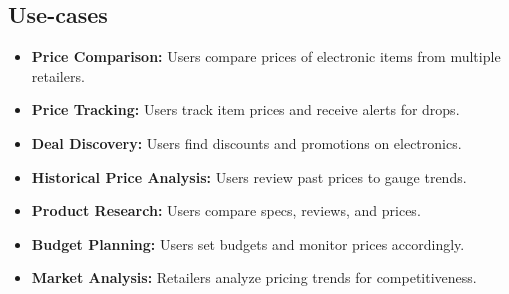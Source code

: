 \documentclass[a4paper,14pt,onecolumn]{report}
\begin{document}
	\subsection{Use-cases}
	\begin{itemize}
		\item \textbf{Price Comparison:} Users compare prices of electronic items from multiple retailers.
		\item \textbf{Price Tracking:} Users track item prices and receive alerts for drops.
		\item \textbf{Deal Discovery:} Users find discounts and promotions on electronics.
		\item \textbf{Historical Price Analysis:} Users review past prices to gauge trends.
		\item \textbf{Product Research:} Users compare specs, reviews, and prices.
		\item \textbf{Budget Planning:} Users set budgets and monitor prices accordingly.
		\item \textbf{Market Analysis:} Retailers analyze pricing trends for competitiveness.
	\end{itemize}
	
\end{document}
